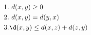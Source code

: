 \documentclass[preview]{standalone}
\begin{document}
\begin{align*}
& 1. \ d(x,y) \geq 0 \\& 2. \ d(x,y)=d(y,x) \\& 3. \d(x,y) \leq d(x,z) + d(z,y) \\&
\end{align*}
\end{document}
